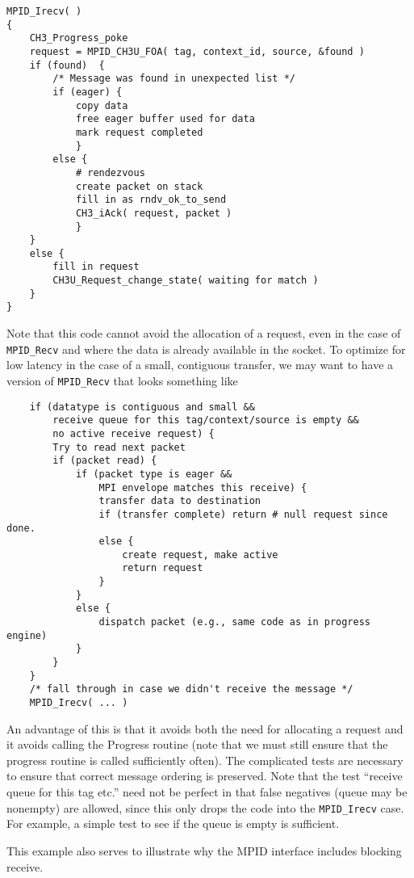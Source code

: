 \documentclass{article}
\def\code{\begingroup\makeustext\eatcode}
\def\eatcode#1{\texttt{#1}\endgroup}
\begin{document}
\begin{verbatim}
MPID_Irecv( )
{
    CH3_Progress_poke
    request = MPID_CH3U_FOA( tag, context_id, source, &found )
    if (found)  {
        /* Message was found in unexpected list */
        if (eager) {
            copy data
            free eager buffer used for data
            mark request completed
            }
        else {
            # rendezvous
            create packet on stack
            fill in as rndv_ok_to_send
            CH3_iAck( request, packet )
            }
    }
    else {
        fill in request
        CH3U_Request_change_state( waiting for match )
    }
}
\end{verbatim}

Note that this code cannot avoid the allocation of a request, even in
the case of \code{MPID_Recv} and where the data is already available in the
socket.  To
optimize for low latency in the case of a small, contiguous transfer,
we may want to have a version of \code{MPID_Recv} that looks something
like
\begin{verbatim}
    if (datatype is contiguous and small &&
        receive queue for this tag/context/source is empty &&
        no active receive request) {
        Try to read next packet
        if (packet read) {
            if (packet type is eager &&
                MPI envelope matches this receive) {
                transfer data to destination
                if (transfer complete) return # null request since done.
                else {
                    create request, make active
                    return request
                }
            }
            else {
                dispatch packet (e.g., same code as in progress engine)
            }
        } 
    }
    /* fall through in case we didn't receive the message */
    MPID_Irecv( ... )
\end{verbatim}
An advantage of this is that it avoids both the need for allocating a
request and it avoids calling the Progress routine (note that we must
still ensure that the progress routine is called sufficiently often).
The complicated tests are necessary to ensure that correct message
ordering is preserved. Note that the test ``receive queue for this tag
etc.'' need not be perfect in that false negatives (queue may be
nonempty) are allowed, since this only drops the code into the
\code{MPID_Irecv} case.  For example, a simple test to see if the
queue is empty is sufficient.

This example also serves to illustrate why the MPID interface includes
blocking receive.
\end{document}
